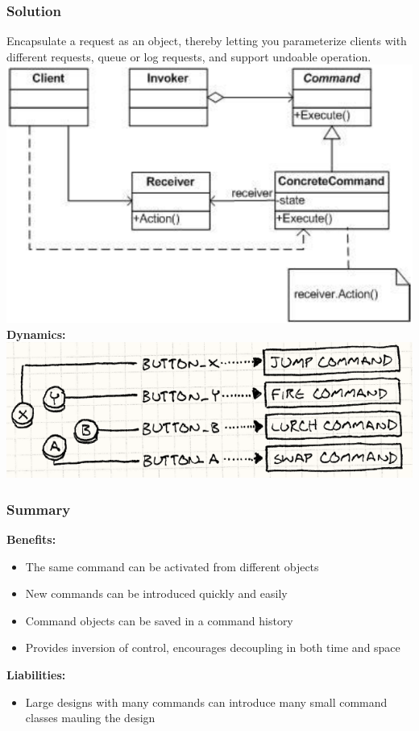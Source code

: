 \subsubsection{Solution}
Encapsulate a request as an object, thereby letting you parameterize clients with different requests, queue or log requests, and support undoable operation.\\ 
\includegraphics[width=\linewidth]{./img/command.png}
\textbf{Dynamics:}\\ 
\includegraphics[width=\linewidth]{./img/command_dynamic.png}
\subsubsection{Summary}
\textbf{Benefits:}
\begin{itemize}
    \item The same command can be activated from different objects
    \item New commands can be introduced quickly and easily
    \item Command objects can be saved in a command history
    \item Provides inversion of control, encourages decoupling in both time and space
\end{itemize}
\textbf{Liabilities:}
\begin{itemize}
    \item Large designs with many commands can introduce many small command classes mauling the design
\end{itemize}

